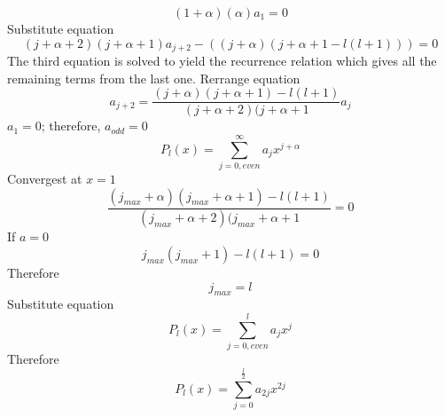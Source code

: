 \documentclass[12pt]{article}
\begin{document}
        \begin{equation} \label{eq: a2-27}
            (1 + \alpha) (\alpha) a_1 = 0
        \end{equation}            
        Substitute equation
        \begin{equation} \label{eq: a2-28}
            (j + \alpha + 2) (j + \alpha + 1) a_{j + 2} - ((j + \alpha) (j + \alpha + 1 - l(l+1))) = 0
        \end{equation}  
        The third equation is solved to yield the recurrence relation which gives all the remaining terms from the last one. Rerrange equation
        \begin{equation} \label{eq: a2-29}
            a_{j+2} = \frac{(j+\alpha)(j+\alpha+1) - l(l+1)}{(j + \alpha + 2) (j + \alpha + 1} a_j
        \end{equation}      
        $a_1 = 0$; therefore, $a_{odd} = 0$
        \begin{equation} \label{eq: a2-30}
            P_l(x) = \sum_{j=0,even}^{\infty} a_j x^{j+\alpha}
        \end{equation}  
        Convergest at $x=1$
        \begin{equation} \label{eq: a2-31}
            \frac{(j_{max}+\alpha)(j_{max}+\alpha+1) - l(l+1)}{(j_{max} + \alpha + 2) (j_{max} + \alpha + 1} =0
        \end{equation}      
        If $a=0$
        \begin{equation} \label{eq: a2-32}
            j_{max} (j_{max} + 1) - l(l+1) =0
        \end{equation}      
        Therefore 
        \begin{equation} \label{eq: a2-33}
            j_{max}=l
        \end{equation}          
        Substitute equation
        \begin{equation} \label{eq: a2-34}
            P_l(x) = \sum_{j=0,even}^{l} a_j x^{j}
        \end{equation}      
        Therefore 
        \begin{equation} \label{eq: a2-35}
            P_l(x) = \sum_{j=0}^{\frac{l}{2}} a_{2j }x^{2j}
        \end{equation}    
\end{document}
